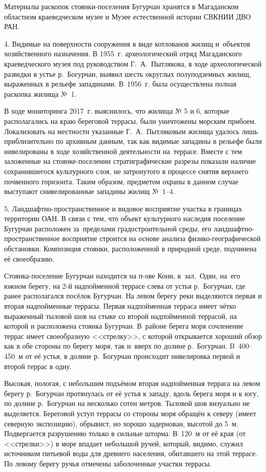 Материалы раскопок стоянки-поселения Бугурчан хранятся в Магаданском областном краеведческом музее и Музее естественной истории СВКНИИ ДВО РАН.

4. Видимые на поверхности сооружения в виде котлованов жилищ и~объектов хозяйственного назначения. В 1955~г. археологический отряд Магаданского краеведческого музея под руководством Г.~А.~Пытлякова, в ходе археологической разведки в устье р.~Богурчан, выявил шесть округлых полуподземных жилищ, выраженных в рельефе западинами. В~1956~г. была осуществлена полная раскопка жилища №~1.

В ходе мониторинга 2017~г. выяснилось, что жилища № 5 и 6, которые располагались на краю береговой террасы, были уничтожены морским прибоем. Локализовать на местности указанные Г.~А.~Пытляковым жилища удалось лишь приблизительно по архивным данным, так как видимые западины в рельефе были нивелированы в ходе хозяйственной деятельности на~террасе. Вместе с тем заложенные на стоянке-поселении стратиграфические разрезы показали наличие сохранившегося культурного слоя, не затронутого в процессе снятия верхнего почвенного горизонта. Таким образом, предметом охраны в данном случае выступают снивелированные западины жилищ №~1--4.

5. Ландшафтно-пространственное и видовое восприятие участка в границах территории ОАН. В связи  с тем, что объект культурного наследия поселение Бугурчан расположен за~пределами градостроительной среды, его ландшафтно-пространственное восприятие строится на основе анализа физико-географической обстановки. Композиция стоянки, расположенной в природной среде, подчинена её своеобразию.

Стоянка-поселение Бугурчан находится на п-ове Кони, в~зал.~Одян, на~его южном берегу, на 2-й надпойменной террасе слева от устья р.~Богурчан, где ранее располагался посёлок Бугурчан. На левом берегу реки выделяются первая и вторая надпойменные террасы. Первая надпойменная терраса имеет чётко выраженный тыловой шов на стыке со второй надпойменной террасой, на которой и расположена стоянка Бугурчан. В~районе берега моря сочленение террас имеет своеобразную <<стрелку>>, с которой открывается хороший обзор как в обе стороны по берегу моря, так и~вверх по долине р.~Богурчан. B~400--450~м от её устья, в долине р.~Богурчан происходит нивелировка первой и второй террас в одну.

Высокая, пологая, с небольшим подъёмом вторая надпойменная терраса на левом берегу р.~Богурчан протянулась от её устья к западу, вдоль берега моря и к югу, по долине р.~Богурчан на несколько сотен метров. Тыловой шов визуально не выделяется. Береговой уступ террасы со стороны моря обращён к северу (имеет северную экспозицию), обрывист, но хорошо задернован, высотой до 5~м. Подвергается разрушению только в сильные шторма. В~120~м от её края (от <<стрелки>>) в море впадает небольшой ручей, который, видимо, служил источником питьевой воды для древнего населения, обитавшего на этой террасе. По левому берегу ручья отмечены заболоченные участки террасы.

